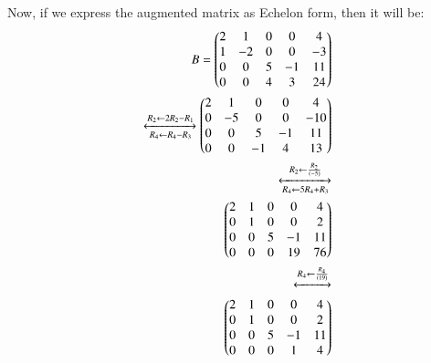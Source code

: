 Now, if we express the augmented matrix as Echelon form, then it will be:\\

\begin{equation}
\begin{aligned}
    B=  \begin{pmatrix}
      2       & 1    & 0   & 0  & 4\\ 
      1       & -2   & 0   & 0  & -3\\
      0       & 0    & 5   & -1  & 11\\ 
      0       & 0   & 4   & 3   & 24\\
            
    \end{pmatrix}\\
    \xleftrightarrow
    [R_4\leftarrow R_4 - R_3]{R_2\leftarrow 2R_2 - R_1} 
    \begin{pmatrix}
      2       & 1    & 0   & 0  & 4\\ 
      0       & -5   & 0   & 0  & -10\\
      0       & 0    & 5   & -1  & 11\\ 
      0       & 0   & -1   & 4   & 13\\
            
    \end{pmatrix}\\
    \xleftrightarrow
    [R_4\leftarrow 5R_4 + R_3]{R_2\leftarrow \frac{R_2}{(-5)}}\\
    \begin{pmatrix}
      2       & 1    & 0   & 0  & 4\\ 
      0       & 1   & 0   & 0  & 2\\
      0       & 0    & 5   & -1  & 11\\ 
      0       & 0   & 0   & 19   & 76\\
            
    \end{pmatrix}\\
    \xleftrightarrow
    []{R_4\leftarrow \frac{R_4}{(19)}}\\
    \begin{pmatrix}
      2       & 1    & 0   & 0  & 4\\ 
      0       & 1   & 0   & 0  & 2\\
      0       & 0    & 5   & -1  & 11\\ 
      0       & 0   & 0   & 1   & 4\\
            

\end{pmatrix}
\end{aligned}
\end{equation}
